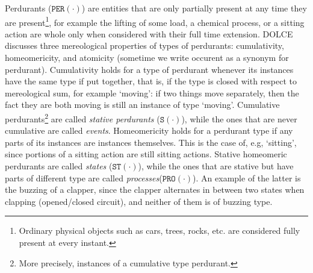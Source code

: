 \documentclass[sw]{iosart2x}
\newcommand{\generalStyle}[1]{\texttt{#1}}
\newcommand{\uniRel}[2]{\generalStyle{#1}(#2)}
\newcommand{\DOLCE}{\textsc{DOLCE}\xspace} %
\newcommand{\DOLCEState}[1]{\uniRel{{ST}}{#1}}
\newcommand{\DOLCEProcess}[1]{\uniRel{PRO}{#1}}
\newcommand{\DOLCEPerdurant}[1]{\uniRel{{PER}}{#1}}
\newcommand{\DOLCEStative}[1]{\uniRel{{S}}{#1}}
\newcommand{\firstTimeKeyWord}[1]{\textit{#1}}
\newcommand{\quotes}[1]{`#1'}
\begin{document}
Perdurants ($\DOLCEPerdurant{\cdot}$) are entities that are only partially present at any time they are present\footnote{Ordinary physical objects such as cars, trees, rocks, etc. are considered fully present at every instant.}, for example the lifting of some load, a chemical process, or a sitting action are whole only when considered with their full time extension. 
\DOLCE discusses three mereological properties of types of perdurants: cumulativity, homeomericity, and atomicity (sometime we write occurent as a synonym for perdurant).
Cumulativity holds for a type of perdurant whenever its instances have the same type if put together, that is, if the type is closed with respect to mereological sum, for example \quotes{moving}: if two things move separately, then the fact they are both moving is still an instance of type \quotes{moving}.
Cumulative perdurants\footnote{More precisely, instances of a cumulative type perdurant.} are called \firstTimeKeyWord{stative perdurants} ($\DOLCEStative{\cdot}$), while the ones that are never cumulative are called \firstTimeKeyWord{events}.
Homeomericity holds for a perdurant type if any parts of its instances are instances themselves.
This is the case of, e.g, \quotes{sitting}, since portions of a sitting action are still sitting actions.
Stative homeomeric perdurants are called \firstTimeKeyWord{states} ($\DOLCEState{\cdot}$), while the ones that are stative but have parts of different type are called \firstTimeKeyWord{processes}($\DOLCEProcess{\cdot}$).
An example of the latter is the buzzing of a clapper, since the clapper alternates in between two states when clapping (opened/closed circuit), and neither of them is of buzzing type.
\end{document}
